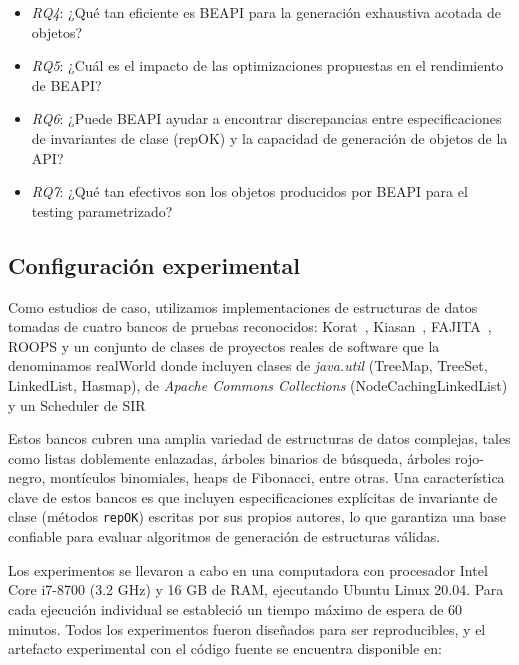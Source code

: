 \begin{itemize}
\item \emph{RQ4}: ¿Qué tan eficiente es BEAPI para la generación exhaustiva                                                                                       
    acotada de objetos?
\item\emph{RQ5}: ¿Cuál es el impacto de las optimizaciones propuestas en el
    rendimiento de BEAPI?
\item\emph{RQ6}: ¿Puede BEAPI ayudar a encontrar discrepancias entre
    especificaciones de invariantes de clase (repOK) y la capacidad de generación de objetos de la API?
\item\emph{RQ7}: ¿Qué tan efectivos son los objetos producidos por BEAPI para el
    testing parametrizado?  
\end{itemize}

\subsection{Configuración experimental}

Como estudios de caso, utilizamos implementaciones de estructuras de datos tomadas de cuatro bancos 
de pruebas reconocidos: \textsf{Korat}~\cite{Boyapati02}, \textsf{Kiasan}~\cite{Deng06}, 
\textsf{FAJITA}~\cite{Abad13}, \textsf{ROOPS} y un conjunto de clases de proyectos reales de software que la denominamos \textsf{realWorld}
donde incluyen clases de \emph{java.util} (TreeMap, TreeSet, LinkedList, Hasmap), de \emph{Apache Commons Collections} (NodeCachingLinkedList) y un Scheduler de SIR

Estos bancos cubren una amplia variedad de estructuras de datos complejas, tales como listas doblemente enlazadas, árboles binarios de búsqueda, 
árboles rojo-negro, montículos binomiales, heaps de Fibonacci, entre otras. Una característica clave 
de estos bancos es que incluyen especificaciones explícitas de invariante de clase (métodos 
\texttt{repOK}) escritas por sus propios autores, lo que garantiza una base confiable para evaluar 
algoritmos de generación de estructuras válidas.

Los experimentos se llevaron a cabo en una computadora con procesador Intel Core i7-8700 
(3.2 GHz) y 16 GB de RAM, ejecutando Ubuntu Linux 20.04. Para cada ejecución individual se estableció 
un tiempo máximo de espera de 60 minutos. Todos los experimentos fueron diseñados para ser reproducibles, 
y el artefacto experimental con el código fuente se encuentra disponible en: 

